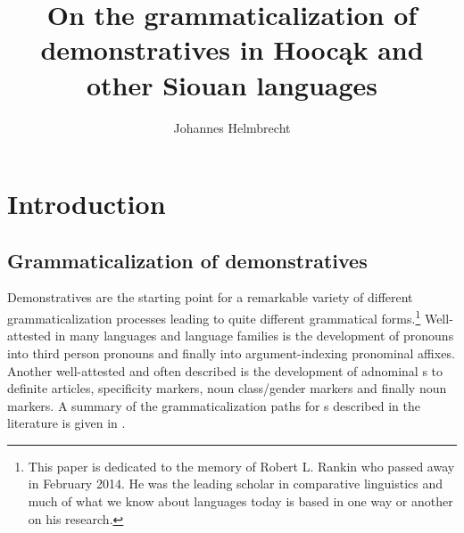 \documentclass[output=paper]{langsci/langscibook}
\title{On the grammaticalization of demonstratives in Hoocąk and other Siouan languages}
\author{%
 Johannes Helmbrecht \affiliation{University of Regensburg}
}
\begin{document}
 




\section{Introduction}\label{sec:helmbrecht:1}
\subsection{Grammaticalization of demonstratives}\label{sec:helmbrecht:1.1}

Demonstratives are the starting point for a remarkable variety of different grammaticalization processes leading to quite different grammatical forms.\footnote{This paper is dedicated to the memory of Robert L. Rankin who passed away in February 2014. He was the leading scholar in comparative  linguistics and much of what we know about  languages today is based in one way or another on his research.}
Well-attested in many languages and language families is the development of  pronouns into third person pronouns and finally into argument-indexing pronominal affixes. Another well-attested and often described  is the development of adnominal s to definite articles, specificity markers, noun class/gender markers and finally noun markers. A summary of the grammaticalization paths for s described in the literature is given in . 
\end{document}
